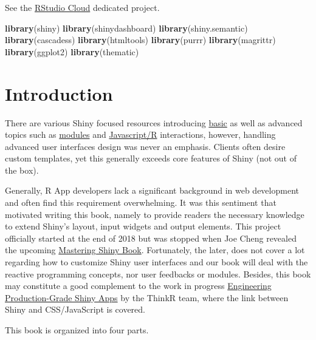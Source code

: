 \documentclass[]{book}
\newenvironment{Shaded}{\begin{snugshade}}{\end{snugshade}}
\newcommand{\KeywordTok}[1]{\textcolor[rgb]{0.13,0.29,0.53}{\textbf{#1}}}
\newcommand{\NormalTok}[1]{#1}
\begin{document}
See the \href{https://rstudio.cloud}{RStudio Cloud} dedicated project.

\begin{Shaded}
\begin{Highlighting}[]
\KeywordTok{library}\NormalTok{(shiny)}
\KeywordTok{library}\NormalTok{(shinydashboard)}
\KeywordTok{library}\NormalTok{(shiny.semantic)}
\KeywordTok{library}\NormalTok{(cascadess)}
\KeywordTok{library}\NormalTok{(htmltools)}
\KeywordTok{library}\NormalTok{(purrr)}
\KeywordTok{library}\NormalTok{(magrittr)}
\KeywordTok{library}\NormalTok{(ggplot2)}
\KeywordTok{library}\NormalTok{(thematic)}
\end{Highlighting}
\end{Shaded}

\hypertarget{intro}{%
\chapter{Introduction}\label{intro}}

There are various Shiny focused resources introducing \href{https://shiny.rstudio.com/tutorial/}{basic} as well as advanced topics such as \href{https://shiny.rstudio.com/articles/\#modules}{modules} and \href{https://js4shiny.com}{Javascript/R} interactions, however, handling advanced user interfaces design was never an emphasis. Clients often desire custom templates, yet this generally exceeds core features of Shiny (not out of the box).

Generally, R App developers lack a significant background in web development and often find this requirement overwhelming. It was this sentiment that motivated writing this book, namely to provide readers the necessary knowledge to extend Shiny's layout, input widgets and output elements. This project officially started at the end of 2018 but was stopped when Joe Cheng revealed the upcoming \href{https://mastering-shiny.org}{Mastering Shiny Book}. Fortunately, the later, does not cover a lot regarding how to customize Shiny user interfaces and our book will deal with the reactive programming concepts, nor user feedbacks or modules. Besides, this book may constitute a good complement to the work in progress \href{https://engineering-shiny.org}{Engineering Production-Grade Shiny Apps} by the ThinkR team, where the link between Shiny and CSS/JavaScript is covered.

This book is organized into four parts.
\end{document}
